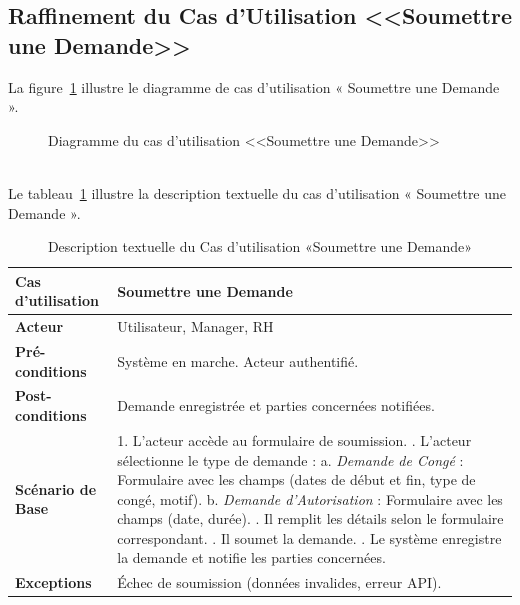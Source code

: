 \subsection{Raffinement du Cas d'Utilisation <<Soumettre une Demande>>}
La figure~\ref{fig:usecase_submit_request} illustre le diagramme de cas d'utilisation « Soumettre une Demande ».
\begin{figure}[h]
     \centering
     \caption{Diagramme du cas d'utilisation <<Soumettre une Demande>>}
     \label{fig:usecase_submit_request}
\end{figure}\\
Le tableau~\ref{tab:submit_request} illustre la description textuelle du cas d’utilisation « Soumettre une Demande ».
\newpage
\begin{table}[!ht]
\centering
\caption{Description textuelle du Cas d’utilisation «Soumettre une Demande»}
\label{tab:submit_request}
\renewcommand{\arraystretch}{1.2}
\begin{tabular}{|p{4.2cm}|p{11cm}|}
\hline
\textbf{Cas d'utilisation} & Soumettre une Demande \\
\hline
\textbf{Acteur} & Utilisateur, Manager, RH \\
\hline
\textbf{Pré-conditions} & Système en marche. \newline Acteur authentifié. \\
\hline
\textbf{Post-conditions} & Demande enregistrée et parties concernées notifiées. \\
\hline
\textbf{Scénario de Base} & 
1. L’acteur accède au formulaire de soumission. \newline
2. L’acteur sélectionne le type de demande : \newline
   \quad a. \textit{Demande de Congé} : Formulaire avec les champs (dates de début et fin, type de congé, motif). \newline
   \quad b. \textit{Demande d’Autorisation} : Formulaire avec les champs (date, durée). \newline
3. Il remplit les détails selon le formulaire correspondant. \newline
4. Il soumet la demande. \newline
5. Le système enregistre la demande et notifie les parties concernées. \\
\hline
\textbf{Exceptions} & 
Échec de soumission (données invalides, erreur API). \\
\hline
\end{tabular}
\end{table}

